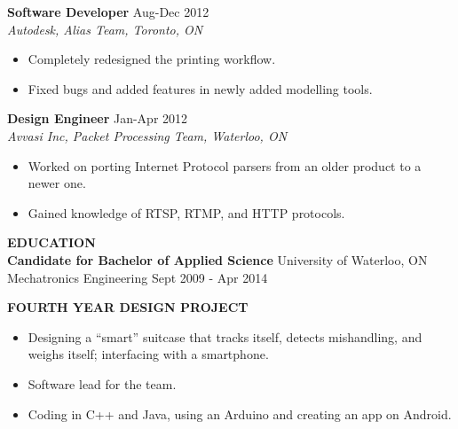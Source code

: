 \documentclass{letter}
\begin{document}
{\bf Software Developer} \hfill Aug-Dec 2012 \\
{\sl Autodesk, Alias Team, Toronto, ON}
\begin{itemize}
  \item Completely redesigned the printing workflow.
  \item Fixed bugs and added features in newly added modelling tools.
\end{itemize}

{\bf Design Engineer} \hfill Jan-Apr 2012 \\
{\sl Avvasi Inc, Packet Processing Team, Waterloo, ON}
\begin{itemize}
  \item Worked on porting Internet Protocol parsers from an older product to a newer one.
  \item Gained knowledge of RTSP, RTMP, and HTTP protocols.
\end{itemize}

{\large\bf EDUCATION} \\
{\bf Candidate for Bachelor of Applied Science} \hfill University of Waterloo, ON \\
Mechatronics Engineering \hfill Sept 2009 - Apr 2014

{\large\bf FOURTH YEAR DESIGN PROJECT}
\begin{itemize}
  \item Designing a ``smart'' suitcase that tracks itself, detects mishandling, and weighs itself; interfacing with a smartphone.
  \item Software lead for the team.
  \item Coding in C++ and Java, using an Arduino and creating an app on Android.
\end{itemize}
\end{document}

